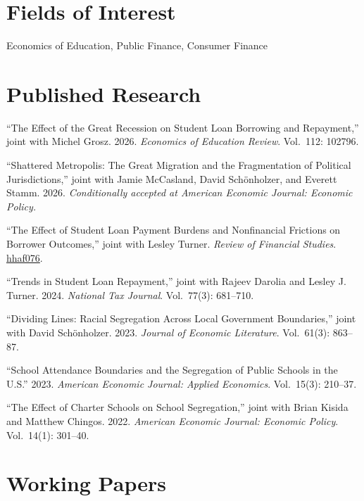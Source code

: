 \documentclass[11pt,letterpaper]{article}
\begin{document}
\section*{Fields of Interest}

Economics of Education, Public Finance, Consumer Finance

\section*{Published Research}

``The Effect of the Great Recession on Student Loan Borrowing and Repayment,'' joint with Michel Grosz. 2026. \textit{Economics of Education Review}. Vol.~112: 102796.

\medskip

``Shattered Metropolis: The Great Migration and the Fragmentation of Political Jurisdictions,'' joint with Jamie McCasland, David Sch\"onholzer, and Everett Stamm. 2026. \textit{Conditionally accepted at American Economic Journal: Economic Policy.}

\medskip

``The Effect of Student Loan Payment Burdens and Nonfinancial Frictions on Borrower Outcomes,'' joint with Lesley Turner. \textit{Review of Financial Studies}. \href{https://doi.org/10.1093/rfs/hhaf076}{hhaf076}.

\medskip

``Trends in Student Loan Repayment,'' joint with Rajeev Darolia and Lesley J. Turner. 2024. \textit{National Tax Journal}. Vol.~77(3): 681--710.

\medskip

``Dividing Lines: Racial Segregation Across Local Government Boundaries,'' joint with David Sch\"onholzer. 2023. \textit{Journal of Economic Literature}. Vol.~61(3): 863--87.

\medskip

``School Attendance Boundaries and the Segregation of Public Schools in the U.S.'' 2023. \textit{American Economic Journal: Applied Economics}. Vol.~15(3): 210--37.

\medskip

``The Effect of Charter Schools on School Segregation,'' joint with Brian Kisida and Matthew Chingos. 2022. \textit{American Economic Journal: Economic Policy}. Vol.~14(1): 301--40.

\section*{Working Papers}
\end{document}
